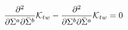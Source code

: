 \begin{equation}
\label{constraint1}
\frac{{\partial}^2}{\partial \Sigma^{a}\partial {\bar \Sigma}^b}{\cal K}_{tw}-
\frac{{\partial}^2}{\partial \Sigma^{b}\partial
{\bar \Sigma}^{a}}{\cal K}_{tw}=0
\end{equation}

